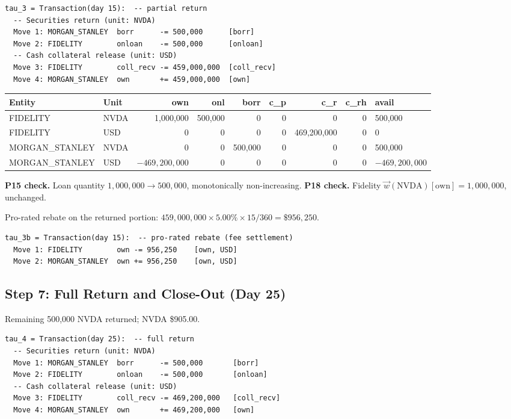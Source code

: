 \documentclass[11pt,a4paper]{article}
\begin{document}
\begin{lstlisting}
tau_3 = Transaction(day 15):  -- partial return
  -- Securities return (unit: NVDA)
  Move 1: MORGAN_STANLEY  borr      -= 500,000      [borr]
  Move 2: FIDELITY        onloan    -= 500,000      [onloan]
  -- Cash collateral release (unit: USD)
  Move 3: FIDELITY        coll_recv -= 459,000,000  [coll_recv]
  Move 4: MORGAN_STANLEY  own       += 459,000,000  [own]
\end{lstlisting}

\begin{center}\footnotesize\setlength{\tabcolsep}{4pt}
\begin{tabular}{l l r r r r r r l}
\toprule
\textbf{Entity} & \textbf{Unit} & own & onl & borr & c\_p & c\_r & c\_rh & avail \\
\midrule
FIDELITY & NVDA & 1{,}000{,}000 & 500{,}000 & 0 & 0 & 0 & 0 & 500{,}000 \\
FIDELITY & USD & 0 & 0 & 0 & 0 & 469{,}200{,}000 & 0 & 0 \\
\midrule
MORGAN\_STANLEY & NVDA & 0 & 0 & 500{,}000 & 0 & 0 & 0 & 500{,}000 \\
MORGAN\_STANLEY & USD & $-469{,}200{,}000$ & 0 & 0 & 0 & 0 & 0 & $-469{,}200{,}000$ \\
\bottomrule
\end{tabular}
\end{center}

\noindent\textbf{P15 check.} Loan quantity $1{,}000{,}000 \to 500{,}000$, monotonically non-increasing. \checkmark\quad
\textbf{P18 check.} Fidelity $\vec{w}(\text{NVDA})[\mathrm{own}] = 1{,}000{,}000$, unchanged. \checkmark

\noindent Pro-rated rebate on the returned portion: $459{,}000{,}000 \times 5.00\% \times 15/360 = \$956{,}250$.

\begin{lstlisting}
tau_3b = Transaction(day 15):  -- pro-rated rebate (fee settlement)
  Move 1: FIDELITY        own -= 956,250    [own, USD]
  Move 2: MORGAN_STANLEY  own += 956,250    [own, USD]
\end{lstlisting}

\subsection{Step 7: Full Return and Close-Out (Day 25)}
\label{sec:us-step7}

Remaining 500{,}000 NVDA returned; NVDA \$905.00.

\begin{lstlisting}
tau_4 = Transaction(day 25):  -- full return
  -- Securities return (unit: NVDA)
  Move 1: MORGAN_STANLEY  borr      -= 500,000       [borr]
  Move 2: FIDELITY        onloan    -= 500,000       [onloan]
  -- Cash collateral release (unit: USD)
  Move 3: FIDELITY        coll_recv -= 469,200,000   [coll_recv]
  Move 4: MORGAN_STANLEY  own       += 469,200,000   [own]
\end{lstlisting}
\end{document}
